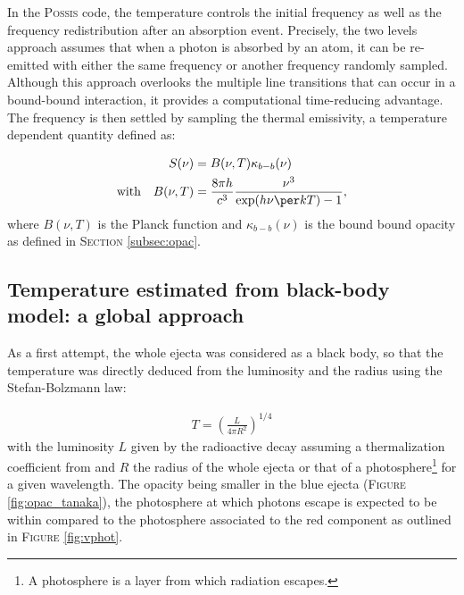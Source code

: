\documentclass[a4paper, twoside, 11pt]{article}
\numberwithin{equation}{section}
\begin{document}
In the P\textsc{ossis} code, the temperature controls the initial frequency as well as the frequency redistribution after an absorption event.  Precisely, the two levels approach assumes that when a photon is absorbed by an atom, it can be re-emitted with either the same frequency or another frequency randomly sampled. Although this approach overlooks the multiple line transitions that can occur in a bound-bound interaction, it provides a computational time-reducing advantage. 
The frequency is then settled by sampling the thermal emissivity, a temperature dependent quantity defined as: 

\begin{align}
S(\nu) &= B(\nu, T) \kappa_{b-b}(\nu)\\
\label{equa:thermalEmissivity}
\nonumber \textnormal{with} \quad  B(\nu, T) &= \frac{8\pi h}{c^3}\frac{\nu^3}{\exp(h\nu\per kT) - 1}, 
\end{align}
where $B(\nu, T)$ is the Planck function and $\kappa_{b-b}(\nu)$ is the bound bound opacity as defined in S\textsc{ection} \ref{subsec:opac}. 

\subsection{Temperature estimated from black-body model: a global approach}
\label{subsec:bb}

\hspace{\parindent}	 As a first attempt, the whole ejecta was considered as a black body, so that the temperature was directly  deduced from the luminosity and the radius using the Stefan-Bolzmann law: 
 
 \begin{align}
 T = \left(\frac{L}{4\pi R^{2}}\right)^{1/4}
 \end{align}
 with the luminosity $L$ given by the radioactive decay assuming a thermalization coefficient from \cite{Barnes_2016} and $R$ the radius of the whole ejecta or that of a photosphere\footnote{A photosphere is a layer from which radiation escapes.} for a given wavelength. 
 The opacity being smaller in the blue ejecta (F\textsc{igure} \ref{fig:opac_tanaka}), the photosphere at which photons escape is expected to be within compared to the photosphere associated to the red component as outlined in F\textsc{igure} \ref{fig:vphot}. \\
 
\end{document}
